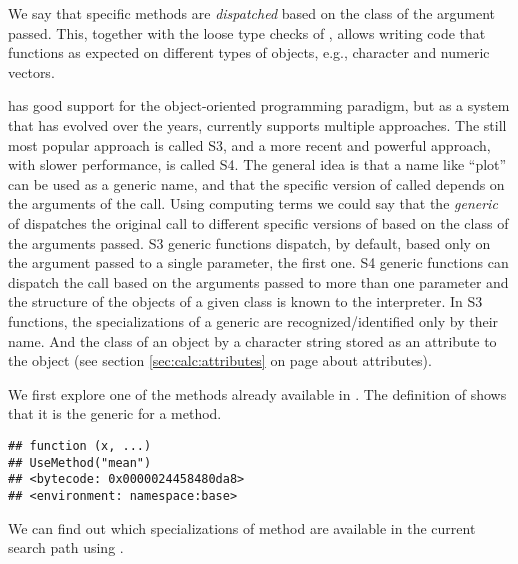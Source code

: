 \documentclass[krantz2]{krantz}\usepackage{knitr}
\begin{document}
We say that specific methods are \emph{dispatched} based on the class of the argument passed. This, together with the loose type checks of \Rlang, allows writing code that functions as expected on different types of objects, e.g., character and numeric vectors.

\Rlang has good support for the object-oriented programming paradigm, but as a system that has evolved over the years, currently \Rlang supports multiple approaches. The still most popular approach is called S3, and a more recent and powerful approach, with slower performance, is called S4. The general idea is that a name like ``plot'' can be used as a generic name, and that the specific version of  called depends on the arguments of the call. Using computing terms we could say that the \emph{generic} of  dispatches the original call to different specific versions of  based on the class of the arguments passed. S3 generic functions dispatch, by default, based only on the argument passed to a single parameter, the first one. S4 generic functions can dispatch the call based on the arguments passed to more than one parameter and the structure of the objects of a given class is known to the interpreter. In S3 functions, the specializations of a generic are recognized/identified only by their name. And the class of an object by a character string stored as an attribute to the object (see section \ref{sec:calc:attributes} on page \pageref{sec:calc:attributes} about attributes).

We first explore one of the methods already available in \Rlang. The definition of  shows that it is the generic for a method.

\begin{knitrout}\footnotesize
{}\color{fgcolor}\begin{kframe}
\begin{alltt}
\end{alltt}
\begin{verbatim}
## function (x, ...) 
## UseMethod("mean")
## <bytecode: 0x0000024458480da8>
## <environment: namespace:base>
\end{verbatim}
\end{kframe}
\end{knitrout}

We can find out which specializations of method are available in the current search path using .
\end{document}
